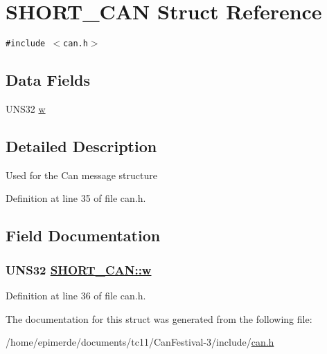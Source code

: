 \hypertarget{structSHORT__CAN}{
\section{SHORT\_\-CAN Struct Reference}
\label{structSHORT__CAN}
}
{\tt \#include $<$can.h$>$}

\subsection*{Data Fields}
\begin{CompactItemize}
\item 
UNS32 \hyperlink{structSHORT__CAN_614e1c6a40f1261e2b15ad69b19e9698}{w}
\end{CompactItemize}


\subsection{Detailed Description}
Used for the Can message structure 



Definition at line 35 of file can.h.

\subsection{Field Documentation}
\hypertarget{structSHORT__CAN_614e1c6a40f1261e2b15ad69b19e9698}{
\subsubsection[w]{\setlength{\rightskip}{0pt plus 5cm}UNS32 \hyperlink{structSHORT__CAN_614e1c6a40f1261e2b15ad69b19e9698}{SHORT\_\-CAN::w}}}
\label{structSHORT__CAN_614e1c6a40f1261e2b15ad69b19e9698}




Definition at line 36 of file can.h.

The documentation for this struct was generated from the following file:\begin{CompactItemize}
\item 
/home/epimerde/documents/tc11/Can\-Festival-3/include/\hyperlink{can_8h}{can.h}\end{CompactItemize}
